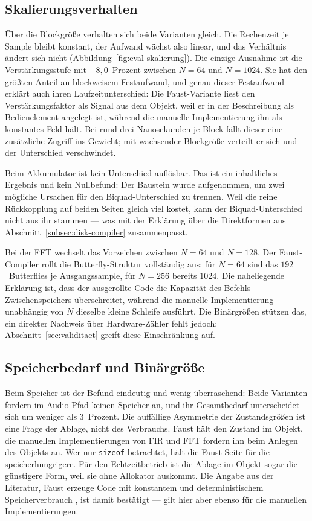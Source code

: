 \subsection{Skalierungsverhalten}

Über die Blockgröße verhalten sich beide Varianten gleich. Die Rechenzeit je Sample bleibt konstant, der Aufwand wächst also linear, und das Verhältnis ändert sich nicht (Abbildung~\ref{fig:eval-skalierung}). Die einzige Ausnahme ist die Verstärkungsstufe mit $-8{,}0$~Prozent zwischen $N=64$ und $N=1024$. Sie hat den größten Anteil an blockweisem Festaufwand, und genau dieser Festaufwand erklärt auch ihren Laufzeitunterschied: Die Faust-Variante liest den Verstärkungsfaktor als Signal aus dem Objekt, weil er in der Beschreibung als Bedienelement angelegt ist, während die manuelle Implementierung ihn als konstantes Feld hält. Bei rund drei Nanosekunden je Block fällt dieser eine zusätzliche Zugriff ins Gewicht; mit wachsender Blockgröße verteilt er sich und der Unterschied verschwindet.

Beim Akkumulator ist kein Unterschied auflösbar. Das ist ein inhaltliches Ergebnis und kein Nullbefund: Der Baustein wurde aufgenommen, um zwei mögliche Ursachen für den Biquad-Unterschied zu trennen. Weil die reine Rückkopplung auf beiden Seiten gleich viel kostet, kann der Biquad-Unterschied nicht aus ihr stammen --- was mit der Erklärung über die Direktformen aus Abschnitt~\ref{subsec:disk-compiler} zusammenpasst.

Bei der FFT wechselt das Vorzeichen zwischen $N=64$ und $N=128$. Der Faust-Compiler rollt die Butterfly-Struktur vollständig aus; für $N=64$ sind das $192$~Butterflies je Ausgangssample, für $N=256$ bereits $1024$. Die naheliegende Erklärung ist, dass der ausgerollte Code die Kapazität des Befehls-Zwischenspeichers überschreitet, während die manuelle Implementierung unabhängig von $N$ dieselbe kleine Schleife ausführt. Die Binärgrößen stützen das, ein direkter Nachweis über Hardware-Zähler fehlt jedoch; Abschnitt~\ref{sec:validitaet} greift diese Einschränkung auf.

\subsection{Speicherbedarf und Binärgröße}

Beim Speicher ist der Befund eindeutig und wenig überraschend: Beide Varianten fordern im Audio-Pfad keinen Speicher an, und ihr Gesamtbedarf unterscheidet sich um weniger als $3$~Prozent. Die auffällige Asymmetrie der Zustandsgrößen ist eine Frage der Ablage, nicht des Verbrauchs. Faust hält den Zustand im Objekt, die manuellen Implementierungen von FIR und FFT fordern ihn beim Anlegen des Objekts an. Wer nur \texttt{sizeof} betrachtet, hält die Faust-Seite für die speicherhungrigere. Für den Echtzeitbetrieb ist die Ablage im Objekt sogar die günstigere Form, weil sie ohne Allokator auskommt. Die Angabe aus der Literatur, Faust erzeuge Code mit konstantem und deterministischem Speicherverbrauch \parencite{orlarey:hal-02159014}, ist damit bestätigt --- gilt hier aber ebenso für die manuellen Implementierungen.

